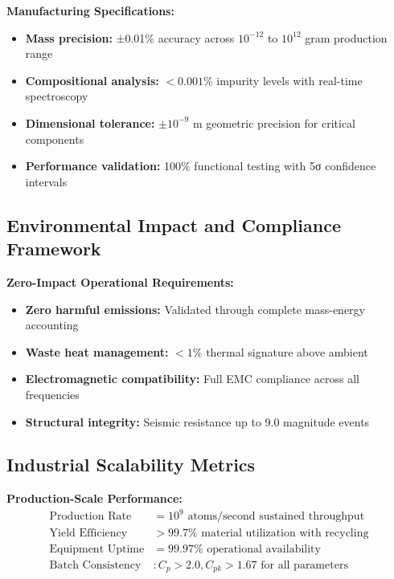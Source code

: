 \documentclass[11pt]{article}
\begin{document}
\textbf{Manufacturing Specifications:}
\begin{itemize}
    \item \textbf{Mass precision:} ±0.01\% accuracy across $10^{-12}$ to $10^{12}$ gram production range
    \item \textbf{Compositional analysis:} $<0.001\%$ impurity levels with real-time spectroscopy
    \item \textbf{Dimensional tolerance:} $\pm 10^{-9}$ m geometric precision for critical components
    \item \textbf{Performance validation:} 100\% functional testing with 5σ confidence intervals
\end{itemize}

\subsection{Environmental Impact and Compliance Framework}
\textbf{Zero-Impact Operational Requirements:}
\begin{itemize}
    \item \textbf{Zero harmful emissions:} Validated through complete mass-energy accounting
    \item \textbf{Waste heat management:} $<1\%$ thermal signature above ambient
    \item \textbf{Electromagnetic compatibility:} Full EMC compliance across all frequencies
    \item \textbf{Structural integrity:} Seismic resistance up to 9.0 magnitude events
\end{itemize}

\subsection{Industrial Scalability Metrics}
\textbf{Production-Scale Performance:}
\begin{align}
\text{Production Rate} &= 10^9 \text{ atoms/second sustained throughput} \\
\text{Yield Efficiency} &> 99.7\% \text{ material utilization with recycling} \\
\text{Equipment Uptime} &= 99.97\% \text{ operational availability} \\
\text{Batch Consistency} &: C_p > 2.0, C_{pk} > 1.67 \text{ for all parameters}
\end{align}
\end{document}
